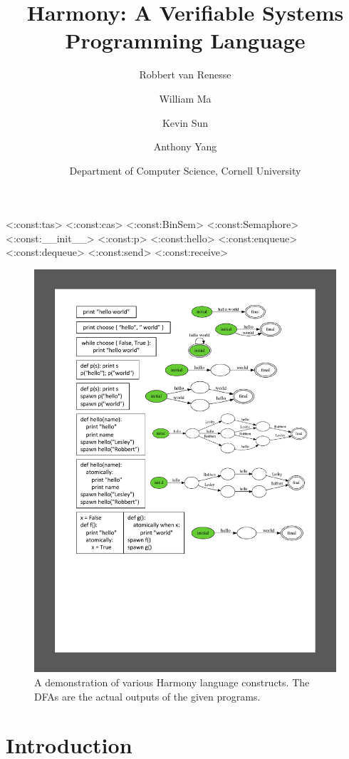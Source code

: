 \documentclass[twocolumn]{article}
\title{Harmony: A Verifiable Systems Programming Language}
\author{Robbert van Renesse \and William Ma \and Kevin Sun \and Anthony Yang}
\date{Department of Computer Science, Cornell University}
\begin{document}
\maketitle

<{:const:tas}>
<{:const:cas}>
<{:const:BinSem}>
<{:const:Semaphore}>
<{:const:__init__}>
<{:const:p}>
<{:const:hello}>
<{:const:enqueue}>
<{:const:dequeue}>
<{:const:send}>
<{:const:receive}>

\begin{figure}
\begin{center}
\includegraphics[width=.9\textwidth]{hello.pdf}
\end{center}
\caption{A demonstration of various Harmony language constructs.  The DFAs
are the actual outputs of the given programs.}
\label{fig:helloworld}
\end{figure}

\section{Introduction}
\end{document}

